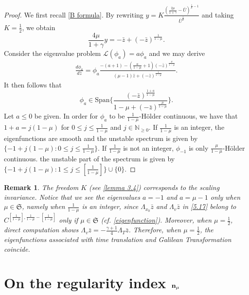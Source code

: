 \documentclass{article}
\newcommand{\ga}{\gamma}
\newcommand{\al}{\alpha}
\def\be{\begin{equation}}
\def\ee{\end{equation}}
\def\ssmu{\mathfrak S}
\def\ndmu{{\bf{n}_{\mu}}}
\numberwithin{equation}{section}
\newtheorem{remark}[theorem]{Remark}
\begin{document}
\begin{proof}
We first recall \eqref{B formula}. By rewriting $y =K \frac{(\frac{2\mu}{1+\ga}-\bar U)^{\frac1\mu -1}}{ \bar U ^\frac1\mu}$ 
and taking $K=\frac12$, we obtain
\be
    \frac{4\mu}{1+\ga} y = -\bar z +(-\bar z)^{\frac{1}{1-\mu}}.
\ee
Consider the eigenvalue problem $ \mathcal L(\phi_a) = a \phi_a$ and we may derive 
\begin{align*}
    \frac{d\phi_a}{d\bar z} = \phi_a \frac{-(a+1)-(\frac{a}{1-\mu}+1)(-\bar z)^{\frac{\mu}{1-\mu}}}{(\mu-1)\bar z +(-\bar z)^\frac{1}{1-\mu}}.
\end{align*}
It then follows that
\be
    \phi_a \in \text{Span}\{\frac{(-\bar z)^{\frac{1+a}{1-\mu}}}{1-\mu+(-\bar z )^{\frac{\mu}{1-\mu}}}\}.
\ee
Let $a\le 0$ be given. In order for $\phi_a$ to be $\frac{1}{1-\mu}$-H\"{o}lder continuous, we have that $1+a = j (1-\mu)$ for $0\le j \le \frac{1}{1-\mu}$ and $j\in \mathbb N_{\ge 0}$. If  $\frac{1}{1-\mu}$ is an integer, the eigenfunctions are smooth and the unstable spectrum is given by $\{  -1 + j (1-\mu) : 0 \le j \le \frac{1}{1-\mu}  \}$.  
If $\frac{1}{1-\mu}$ is not an integer, $\phi_{-1}$ is only $\frac{\mu}{1-\mu}$-H\"{o}lder continuous. the unstable part of the spectrum is given by $\{  -1 + j (1-\mu) : 1 \le j \le [\frac{1}{1-\mu}] \}\cup \{0\}$. 
\end{proof}


\begin{remark}
     The freedom $K$ (see \eqref{lemma 3.4}) corresponds to the scaling invariance.  %
     Notice that  we see the eigenvalues $a=-1$ and $a=\mu-1$ only when $\mu\in\ssmu$, namely when $\frac{1}{1-\mu}$ is an integer, since $\Lambda_{x_0} \bar z$ and $\Lambda_{v} \bar z$ in \eqref{5.17} %
belong to 
$C^{[\frac{1}{1-\mu}], \frac{1}{1-\mu} - [\frac{1}{1-\mu}]}%
    $ only if $\mu\in\ssmu$ (cf. \eqref{eigenfunction}). %
     Moreover, when $\mu=\frac{1}{2}$, direct computation shows $\Lambda_v\bar z = -\frac{\ga+1}{4} \Lambda_T \bar z$.
     Therefore, when $\mu=\frac{1}{2}$, the eigenfunctions associated with time translation and Galilean Transformation coincide. 
\end{remark}

\section{On the regularity index $\ndmu$}\label{Appendix C}
\end{document}
